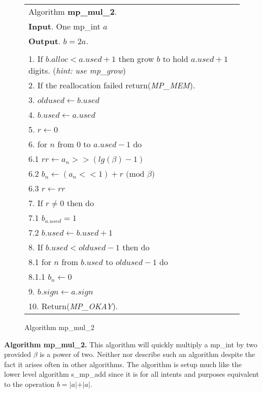\documentclass[b5paper]{book}
\begin{document}
\newpage\begin{figure}[!here]
\begin{small}
\begin{center}
\begin{tabular}{l}
\hline Algorithm \textbf{mp\_mul\_2}. \\
\textbf{Input}.   One mp\_int $a$ \\
\textbf{Output}.  $b = 2a$. \\
\hline \\
1.  If $b.alloc < a.used + 1$ then grow $b$ to hold $a.used + 1$ digits.  (\textit{hint: use mp\_grow}) \\
2.  If the reallocation failed return(\textit{MP\_MEM}). \\
3.  $oldused \leftarrow b.used$ \\
4.  $b.used \leftarrow a.used$ \\
5.  $r \leftarrow 0$ \\
6.  for $n$ from 0 to $a.used - 1$ do \\
\hspace{3mm}6.1  $rr \leftarrow a_n >> (lg(\beta) - 1)$ \\
\hspace{3mm}6.2  $b_n \leftarrow (a_n << 1) + r \mbox{ (mod }\beta\mbox{)}$ \\
\hspace{3mm}6.3  $r \leftarrow rr$ \\
7.  If $r \ne 0$ then do \\
\hspace{3mm}7.1  $b_{a.used} = 1$ \\
\hspace{3mm}7.2  $b.used \leftarrow b.used + 1$ \\
8.  If $b.used < oldused - 1$ then do \\
\hspace{3mm}8.1  for $n$ from $b.used$ to $oldused - 1$ do \\
\hspace{6mm}8.1.1  $b_n \leftarrow 0$ \\
9.  $b.sign \leftarrow a.sign$ \\
10.  Return(\textit{MP\_OKAY}).\\
\hline
\end{tabular}
\end{center}
\end{small}
\caption{Algorithm mp\_mul\_2}
\end{figure}

\textbf{Algorithm mp\_mul\_2.}
This algorithm will quickly multiply a mp\_int by two provided $\beta$ is a power of two.  Neither \cite{TAOCPV2} nor \cite{HAC} describe such 
an algorithm despite the fact it arises often in other algorithms.  The algorithm is setup much like the lower level algorithm s\_mp\_add since 
it is for all intents and purposes equivalent to the operation $b = \vert a \vert + \vert a \vert$.  
\end{document}

